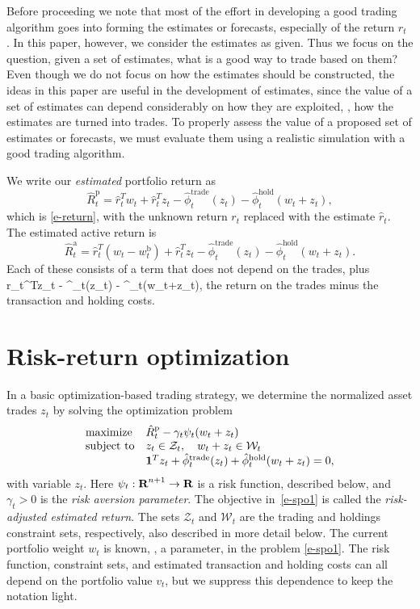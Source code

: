 \documentclass[openany]{article}  %
\newcommand{\trcosthat}{\hat \phi^\mathrm{trade}}
\newcommand{\hldcosthat}{\hat \phi^\mathrm{hold}}
\newcommand{\Rphat}{\hat R^\mathrm{p}}
\newcommand{\Rahat}{\hat R^\mathrm{a}}
\newcommand{\wb}{w^\mathrm{b}}
\begin{document}
Before proceeding we note that most of the effort in developing a
good trading algorithm goes
into forming the estimates or forecasts, especially of the return $r_t$
\cite{campbell1997econometrics,grinold1999active}.  In this paper, however, we consider
the estimates as given.  Thus we focus on the question, given a set
of estimates, what is a good way to trade based on them?
Even though we do not focus on how the estimates should be constructed,
the ideas in this paper are useful in the development of estimates, since
the value of a set of estimates can depend considerably on how they
are exploited, \ie, how the estimates are turned into trades.
To properly assess the value of a proposed set of estimates or forecasts,
we must evaluate them using a realistic simulation with a good
trading algorithm.

We write our \emph{estimated} portfolio return as
\[
\Rphat _t %
= \hat r_t^T w_t + \hat r_t^Tz_t - \trcosthat_t(z_t) - \hldcosthat_t(w_t+z_t),
\]
which is \eqref{e-return}, with the unknown return $r_t$
replaced with the estimate $\hat r_t$.
The estimated active return is
\[
\Rahat _t =
\hat r_t^T (w_t-\wb_t) + \hat r_t^Tz_t - \trcosthat_t(z_t) - \hldcosthat_t(w_t+z_t).
\]
Each of these consists of a term that does not depend on the trades, plus
\BEQ\label{e-comm-obj}
\hat r_t^Tz_t - \trcosthat_t(z_t) - \hldcosthat_t(w_t+z_t),
\EEQ
the return on the trades minus the transaction and holding costs.

\section{Risk-return optimization}
In a basic optimization-based trading strategy,
we determine the normalized asset trades $z_t$ by solving the
optimization problem
\begin{equation}\label{e-spo1}
\begin{array}{ll}
\mbox{maximize} &
\Rphat_t - \gamma_t \psi_t(w_t+z_t) \\
\mbox{subject to} &
z_t \in \mathcal Z_t, \quad
w_t + z_t \in \mathcal W_t \\
& \ones^Tz_t + \trcosthat_t (z_t) + \hldcosthat_t (w_t + z_t) = 0,
\end{array}
\end{equation}
with variable $z_t$.
Here $\psi_t: {\mbox{\bf R}}^{n+1} \to {\mbox{\bf R}}$ is a risk function,
described below, and $\gamma_t >0$ is the \emph{risk aversion parameter}.
The objective in~\eqref{e-spo1} is called the \emph{risk-adjusted estimated return}.
The sets $\mathcal Z_t$ and $\mathcal W_t$
are the trading and holdings constraint sets, respectively,
also described in more detail below.
The current portfolio weight $w_t$ is known, \ie, a parameter, in the problem
\eqref{e-spo1}.
The risk function, constraint sets, and estimated transaction and holding costs
can all depend on the portfolio value $v_t$, but we suppress this dependence
to keep the notation light.
\end{document}
